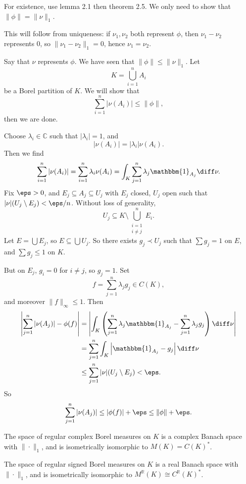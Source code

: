 \documentclass[12pt]{article}
\begin{document}
\begin{proofbox}
	For existence, use lemma 2.1 then theorem 2.5. We only need to show that $\|\phi\| = \|\nu\|_1$.

	This will follow from uniqueness: if $\nu_1, \nu_2$ both represent $\phi$, then $\nu_1 - \nu_2$ represents $0$, so $\|\nu_1 - \nu_2\|_1 = 0$, hence $\nu_1 = \nu_2$.

	Say that $\nu$ represents $\phi$. We have seen that $\|\phi\| \leq \|\nu\|_1$. Let
	\[
	K = \bigcup_{i = 1}^n A_i
	\]
	be a Borel partition of $K$. We will show that
	\[
	\sum_{i = 1}^n |\nu(A_i)| \leq \|\phi\|,
	\]
	then we are done.

	Choose $\lambda_i \in \mathbb{C}$ such that $|\lambda_i| = 1$, and
	\[
	|\nu(A_i)| = |\lambda_i| \nu(A_i).
	\]
	Then we find
	\[
	\sum_{i = 1}^n |\nu(A_i)| = \sum_{i = 1}^n \lambda_i \nu(A_i) = \int_K \sum_{j = 1}^n \lambda_j \mathbbm{1}_{A_j} \diff \nu.
	\]
	Fix $\eps > 0$, and $E_j \subseteq A_j \subseteq U_j$ with $E_j$ closed, $U_j$ open such that $|\nu|(U_j \setminus E_j) < \eps/n$. Without loss of generality,
	\[
	U_j \subseteq K \setminus \bigcup_{\substack{i = 1 \\ i \neq j}}^n E_i.
	\]
	Let $E = \bigcup E_j$, so $E \subseteq \bigcup U_j$. So there exists $g_j \prec U_j$ such that $\sum g_j = 1$ on $E$, and $\sum g_j \leq 1$ on $K$.

	But on $E_j$, $g_i = 0$ for $i \neq j$, so $g_j = 1$. Set
	\[
	f = \sum_{j = 1}^n \lambda_j g_j \in C(K),
	\]
	and moreover $\|f\|_\infty \leq 1$. Then
	\begin{align*}
		\left| \sum_{j = 1}^n |\nu(A_j)| - \phi(f)\right| &= \left| \int_K \left( \sum_{j = 1}^n \lambda_j \mathbbm{1}_{A_j} - \sum_{j = 1}^n \lambda_j g_j \right) \diff \nu \right| \\
								  &= \sum_{j = 1}^n \int_K \left| \mathbbm{1}_{A_j} - g_j \right| \diff \nu \\
								  &\leq \sum_{j = 1}^n |\nu|(U_j \setminus E_j) < \eps.
	\end{align*}
	So
	\[
	\sum_{j = 1}^n |\nu(A_j)| \leq |\phi(f)| + \eps \leq \|\phi\| + \eps.
	\]
\end{proofbox}

\begin{corollary}
	The space of regular complex Borel measures on $K$ is a complex Banach space with $\|\cdot\|_1$, and is isometrically isomorphic to $M(K) = C(K)^{\ast}$.

	The space of regular signed Borel measures on $K$ is a real Banach space with $\|\cdot\|_1$, and is isometrically isomorphic to $M^{\mathbb{R}}(K) \cong C^{\mathbb{R}}(K)^{\ast}$.
\end{corollary}
\end{document}
